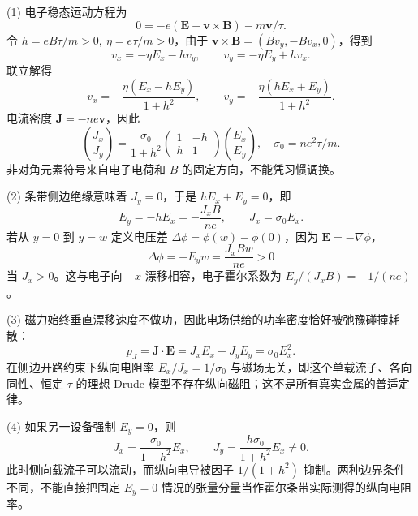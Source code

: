 (1) 电子稳态运动方程为
\[
0=-e(\boldsymbol E+\boldsymbol v\times\boldsymbol B)-m\boldsymbol v/\tau.
\]
令 \(h=eB\tau/m>0,\ \eta=e\tau/m>0\)，由于 \(\boldsymbol v\times\boldsymbol B=(Bv_y,-Bv_x,0)\)，得到
\[
v_x=-\eta E_x-hv_y,\qquad v_y=-\eta E_y+hv_x.
\]
联立解得
\[
v_x=-\frac{\eta(E_x-hE_y)}{1+h^2},\qquad
v_y=-\frac{\eta(hE_x+E_y)}{1+h^2}.
\]
电流密度 \(\boldsymbol J=-ne\boldsymbol v\)，因此
\[
\binom{J_x}{J_y}=\frac{\sigma_0}{1+h^2}
\begin{pmatrix}1&-h\\h&1\end{pmatrix}
\binom{E_x}{E_y},\quad \sigma_0=ne^2\tau/m.
\]
非对角元素符号来自电子电荷和 \(B\) 的固定方向，不能凭习惯调换。

(2) 条带侧边绝缘意味着 \(J_y=0\)，于是 \(hE_x+E_y=0\)，即
\[
E_y=-hE_x=-\frac{J_xB}{ne},\qquad J_x=\sigma_0E_x.
\]
若从 \(y=0\) 到 \(y=w\) 定义电压差 \(\Delta\phi=\phi(w)-\phi(0)\)，因为 \(\boldsymbol E=-\nabla\phi\)，
\[
\Delta\phi=-E_yw=\frac{J_xBw}{ne}>0
\]
当 \(J_x>0\)。这与电子向 \(-x\) 漂移相容，电子霍尔系数为 \(E_y/(J_xB)=-1/(ne)\)。

(3) 磁力始终垂直漂移速度不做功，因此电场供给的功率密度恰好被弛豫碰撞耗散：
\[
p_J=\boldsymbol J\cdot\boldsymbol E=J_xE_x+J_yE_y
=\sigma_0E_x^2.
\]
在侧边开路约束下纵向电阻率 \(E_x/J_x=1/\sigma_0\) 与磁场无关，即这个单载流子、各向同性、恒定 \(\tau\) 的理想 Drude 模型不存在纵向磁阻；这不是所有真实金属的普适定律。

(4) 如果另一设备强制 \(E_y=0\)，则
\[
J_x=\frac{\sigma_0}{1+h^2}E_x,\qquad
J_y=\frac{h\sigma_0}{1+h^2}E_x\ne0.
\]
此时侧向载流子可以流动，而纵向电导被因子 \(1/(1+h^2)\) 抑制。两种边界条件不同，不能直接把固定 \(E_y=0\) 情况的张量分量当作霍尔条带实际测得的纵向电阻率。
